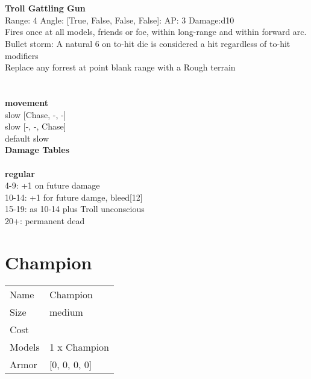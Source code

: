 \ \\

\ \\
{\bf Troll Gattling Gun } \\



Range: 4  Angle: [True, False, False, False]: AP: 3 Damage:d10 \\
Fires once at all models, friends or foe, within long-range and within forward arc.\\ 
Bullet storm: A natural 6 on to-hit die is considered a hit regardless of to-hit modifiers\\ 
Replace any forrest at point blank range with a Rough terrain\\ 




 
\ \\



\ \\ {\bf movement } \\
slow [Chase, -, -] \\
slow [-, -, Chase] \\
default slow \\


{\bf Damage Tables} \\
\ \\ {\bf regular } \\
4-9: +1 on future damage \\
10-14: +1 for future damge, bleed[12] \\
15-19: as 10-14 plus Troll unconscious \\
20+: permanent dead \\










\pagebreak\pagebreak

\section{ Champion }

\begin{tabular}{ll}
  Name & Champion \\
  Size & medium\\
  Cost & \\
  Models & 1 x Champion\\
  Armor & [0, 0, 0, 0]\\
\end{tabular}

